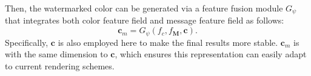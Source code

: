 \documentclass[10pt,twocolumn,letterpaper]{article}
\newcommand{\Sref}[1]{Section~\ref{#1}}
\def\M{{\mathbf{M}}}
\begin{document}



Then, the watermarked color can be generated via a feature fusion module $G_{\psi}$ that integrates both color feature field and message feature field as follows: 
\begin{equation}
\mathbf{c}_m=G_{\psi}(f_c,f_\M,\mathbf{c}).
\label{eq:messagerepresentation}
\end{equation}
Specifically, $\mathbf{c}$ is also employed here to make the final results more stable. $\mathbf{c}_m$ is with the same dimension to $\mathbf{c}$, which ensures this representation can easily adapt to current rendering schemes.







\end{document}
